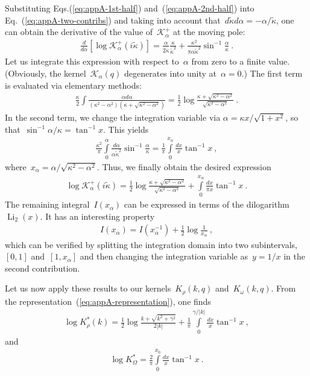 \documentclass[preprint,aps,eqsecnum, prb]{revtex4-1}
\newcommand{\fplus}[1]{{#1}^{+}}
\begin{document}
Substituting Eqs.(\ref{eq:appA-1st-half}) and~(\ref{eq:appA-2nd-half})
into Eq.~(\ref{eq:appA-two-contribs}) and taking into account
that~$d{\tilde \kappa}{d\alpha} =  - \alpha/{\tilde\kappa}$,
one can obtain the derivative of the value of~$\fplus{\mathcal{K}}_\alpha$
at the moving pole:
\begin{align}
  \frac{d}{d\alpha} [\log \fplus{\mathcal{K}}_\alpha(i{\tilde \kappa})] =
  \frac{\alpha}{2{\tilde\kappa}} \frac{\kappa}{{\tilde\kappa}^2}
  + \frac{\kappa^2}{\pi\alpha{\tilde\kappa}^2} \sin^{-1}\frac{\alpha}{\kappa}
  \ .
\end{align}
Let us integrate this expression with respect to~$\alpha$
from zero to a finite value. (Obviously, the kernel~$\mathcal{K}_\alpha(q)$
degenerates into unity at~$\alpha = 0$.)
The first term is evaluated via elementary methods:
\begin{align}
  \frac{\kappa}{2} \int \frac{\alpha d\alpha}{(\kappa^2 - \alpha^2)
  (\kappa + \sqrt{\kappa^2 - \alpha^2})}
  = \frac{1}{2} \log\frac{\kappa + \sqrt{\kappa^2 - \alpha^2}}{
    \sqrt{\kappa^2 - \alpha^2}}\ .
\end{align}
In the second term, we change the integration variable via
$\alpha = \kappa x / \sqrt{1 + x^2}$,
so that~$\sin^{-1} \alpha/\kappa = \tan^{-1} x$. This yields
\begin{align}
  \frac{\kappa^2}{\pi} \int\limits_{0}^{\alpha}
  \frac{d\alpha}{\alpha{\tilde\kappa}^2} \sin^{-1}\frac{\alpha}{\kappa}
  = \frac{1}{\pi} \int\limits_{0}^{x_\alpha} \frac{dx}{x} \tan^{-1} x\ ,
\end{align}
where~$x_\alpha = \alpha/\sqrt{\kappa^2 - \alpha^2}$.
Thus, we finally obtain the desired expression
\begin{align}
  \log \fplus{\mathcal{K}}_\alpha(i{\tilde \kappa})
  = \frac{1}{2}\log\frac{\kappa + \sqrt{\kappa^2 - \alpha^2}}{
  \sqrt{\kappa^2 - \alpha^2}}
  + \int\limits_{0}^{x_\alpha}\frac{dx}{\pi x} \tan^{-1} x\ .
\end{align}
The remaining integral~$I(x_\alpha)$
can be expressed in terms of the dilogarithm
$\mathop{\mathrm{Li}}_2(x)$. It has an interesting property
\begin{align}
I(x_\alpha) = I(x_\alpha^{-1}) + \frac{1}{2} \log\frac{1}{x_\alpha}\ ,
\end{align}
which can be verified by splitting the integration domain
into two subintervals,~$[0, 1]$ and~$[1, x_\alpha]$ and
then changing the integration variable as~$y = 1/x$ in the
second contribution.

Let us now apply these results to our kernels~$K_\rho(k, q)$
and~$K_\omega(k, q)$. From the representation~(\ref{eq:appA-representation}),
one finds
\begin{align}
  \log K_\rho^\ast(k) =  \frac{1}{2} \log\frac{k + \sqrt{k^2 + \gamma^2}}{2|k|}
  + \frac{1}{\pi}\int\limits_{0}^{\gamma/|k|}
  \frac{dx}{x} \tan^{-1}x
\ ,
\end{align}
and
\begin{align}
  \log K_\Omega^\ast =  \frac{2}{\pi}
  \int\limits_{0}^{x_0} \frac{dx}{x}\tan^{-1}x
\ .
\end{align}
\end{document}
